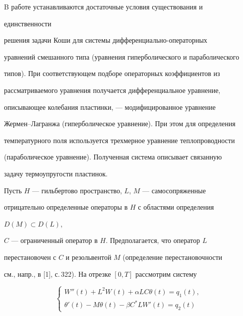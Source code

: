 \pagestyle{plain} %


 




\maketitle 


\label{begin} 


 


 


B работе устанавливаются достаточные условия существования и 


единственности 


решения задачи Коши для системы дифференциально-операторных 


уравнений смешанного типа (уравнения гиперболического и параболического 


типов). При соответствующем подборе операторных коэффициентов из 


рассматриваемого уравнения получается дифференциальное уравнение, 


описывающее колебания пластинки, --- модифицированное уравнение 


Жермен--Лагранжа (гиперболическое уравнение). При этом для определения 


температурного поля используется трехмерное уравнение теплопроводности 


(параболическое уравнение). Полученная система описывает связанную 


задачу термоупругости пластинок. 


 


Пусть $H$ --- гильбертово пространство, $L$, $M$ --- самосопряженные 


отрицательно определенные операторы в $H$ с областями определения 


$D(M)\subset D(L)$, 


$C$ --- ограниченный оператор в $H$. Предполагается, что оператор $L$ 


перестановочен с $C$ и резольвентой $M$ (определение перестановочности 


см., напр., в [1], с.\,322). На отрезке $[0,T]$ рассмотрим систему 


\begin{equation} 


\begin{cases} 


W''(t)+L^2W(t)+\alpha LC\theta(t)=q_1(t),\\ 


\theta'(t)-M\theta(t)-\beta C^*LW'(t)=q_2(t) 


\end{cases} 


\end{equation} 


